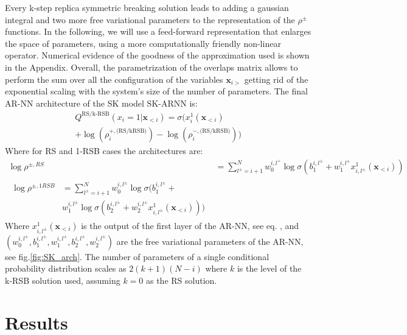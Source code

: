 \documentclass[aps,physrev,10pt,floatfix,reprint]{revtex4-2}
\begin{document}
Every k-step replica symmetric breaking solution leads to adding a gaussian integral and two more free variational parameters to the representation of the $\rho^{\pm}$ functions. 
In the following, we will use a feed-forward representation that enlarges the space of parameters, using a more computationally friendly non-linear operator. 
Numerical evidence of the goodness of the approximation used is shown in the Appendix. 
Overall, the parametrization of the overlaps matrix allows to perform the sum over all the configuration of the variables $\mathbf{x}_{i>}$ getting rid of the exponential scaling with the system's size of the number of parameters. 
The final AR-NN architecture of the SK model $\text{SK-ARNN}$ is: 
\begin{multline}
    Q^{\text{RS/k-RSB}}\left(x_{i}=1|\mathbf{x}_{<i}\right) = \sigma\bigg( 
        x_i^1(\mathbf{x}_{<i}) \\
        +\log(\rho_i^{+, \text{(RS/kRSB)}}) -
         \log(\rho_i^{-, \text{(RS/kRSB)}})
    \bigg)  
\end{multline}
Where for RS and 1-RSB cases the architectures are:
\begin{align*}
    \log \rho^{\pm, RS} & = \sum_{l^{\pm}=i+1}^{N}  w_0^{i,l^+} \log \sigma(b_1^{i,l^{\pm}} +
w_1^{i,l^{\pm}} x_{i,l^{\pm}}^1(\mathbf{x}_{<i})) \\
\begin{split}
    \log \rho^{\pm, 1RSB} & = 
    \sum_{l^{\pm}=i+1}^{N}  w_0^{i,l^{\pm}} \log\sigma(b_1^{i,l^{\pm}} + \\
    &  w_1^{i,l^{\pm}} \log\sigma(b_2^{i,l^{\pm}} +  w_2^{i,l^{\pm}}  x_{i,l^{\pm}}^1(\mathbf{x}_{<i}))) 
    \end{split}
\end{align*}
Where $x_{i,l^{\pm}}^1(\mathbf{x}_{<i})$ is the output of the first layer of the AR-NN, see eq. , and $(w_0^{i,l^{\pm}}, b_1^{i,l^{\pm}}, w_1^{i,l^{\pm}}, b_2^{i,l^{\pm}}, w_2^{i,l^{\pm}})$ are the free variational parameters of the AR-NN, see fig.\ref{fig:SK_arch}. The number of parameters of a single conditional probability distribution scales as $2(k+1)(N-i)$ where $k$ is the level of the k-RSB solution used, assuming $k=0$ as the RS solution.

\section{Results}
\end{document}
